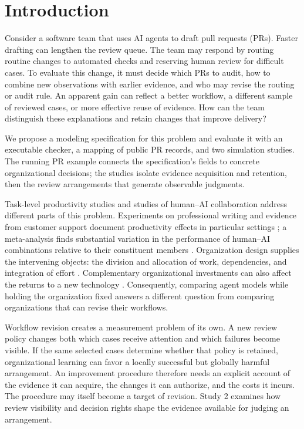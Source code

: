\section{Introduction}
Consider a software team that uses AI agents to draft pull requests (PRs). Faster drafting can lengthen the review queue. The team may respond by routing routine changes to automated checks and reserving human review for difficult cases. To evaluate this change, it must decide which PRs to audit, how to combine new observations with earlier evidence, and who may revise the routing or audit rule. An apparent gain can reflect a better workflow, a different sample of reviewed cases, or more effective reuse of evidence. How can the team distinguish these explanations and retain changes that improve delivery?

We propose a modeling specification for this problem and evaluate it with an executable checker, a mapping of public PR records, and two simulation studies. The running PR example connects the specification's fields to concrete organizational decisions; the studies isolate evidence acquisition and retention, then the review arrangements that generate observable judgments.

Task-level productivity studies and studies of human--AI collaboration address different parts of this problem. Experiments on professional writing and evidence from customer support document productivity effects in particular settings \citep{noy,brynjolfsson}; a meta-analysis finds substantial variation in the performance of human--AI combinations relative to their constituent members \citep{vaccaro}. Organization design supplies the intervening objects: the division and allocation of work, dependencies, and integration of effort \citep{puranam,malone}. Complementary organizational investments can also affect the returns to a new technology \citep{milgrom,jcurve}. Consequently, comparing agent models while holding the organization fixed answers a different question from comparing organizations that can revise their workflows.

Workflow revision creates a measurement problem of its own. A new review policy changes both which cases receive attention and which failures become visible. If the same selected cases determine whether that policy is retained, organizational learning can favor a locally successful but globally harmful arrangement. An improvement procedure therefore needs an explicit account of the evidence it can acquire, the changes it can authorize, and the costs it incurs. The procedure may itself become a target of revision. Study 2 examines how review visibility and decision rights shape the evidence available for judging an arrangement.

